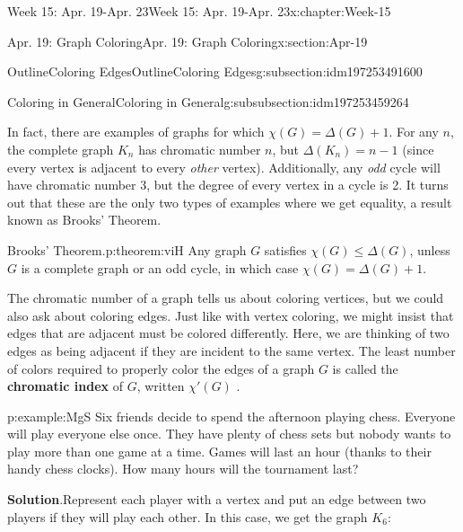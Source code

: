 \documentclass[oneside,10pt,]{book}
\newcommand{\blocktitlefont}{\relax}
\newcommand{\terminology}[1]{\textbf{#1}}
\numberwithin{equation}{section}
\renewcommand{\le}{\leqslant}
\begin{document}
\begin{chapterptx}{Week 15: Apr. 19-Apr. 23}{}{Week 15: Apr. 19-Apr. 23}{}{}{x:chapter:Week-15}
\begin{sectionptx}{Apr. 19: Graph Coloring}{}{Apr. 19: Graph Coloring}{}{}{x:section:Apr-19}
\begin{subsectionptx}{OutlineColoring Edges}{}{OutlineColoring Edges}{}{}{g:subsection:idm197253491600}
\begin{subsubsectionptx}{Coloring in General}{}{Coloring in General}{}{}{g:subsubsection:idm197253459264}
\par
In fact, there are examples of graphs for which \(\chi(G) = \Delta(G) + 1\). For any \(n\), the complete graph \(K_n\) has chromatic number \(n\), but \(\Delta(K_n) = n-1\) (since every vertex is adjacent to every \emph{other} vertex). Additionally, any \emph{odd} cycle will have chromatic number 3, but the degree of every vertex in a cycle is 2. It turns out that these are the only two types of examples where we get equality, a result known as Brooks' Theorem.%
\begin{theorem}{Brooks' Theorem.}{}{p:theorem:viH}%
%
Any graph \(G\) satisfies \(\chi(G) \le \Delta(G)\), unless \(G\) is a complete graph or an odd cycle, in which case \(\chi(G) = \Delta(G) + 1\).%
\end{theorem}
\end{subsubsectionptx}
 The chromatic number of a graph tells us about coloring vertices, but we could also ask about coloring edges. Just like with vertex coloring, we might insist that edges that are adjacent must be colored differently. Here, we are thinking of two edges as being adjacent if they are incident to the same vertex. The least number of colors required to properly color the edges of a graph \(G\) is called the \terminology{chromatic index} of \(G\), written \(\chi'(G)\) \label{g:notation:idm197253410960} .%
\begin{example}{}{p:example:MgS}%
Six friends decide to spend the afternoon playing chess. Everyone will play everyone else once. They have plenty of chess sets but nobody wants to play more than one game at a time. Games will last an hour (thanks to their handy chess clocks). How many hours will the tournament last?%
\par\smallskip%
\noindent\textbf{\blocktitlefont Solution}.\hypertarget{p:solution:hOW}{}\quad{}Represent each player with a vertex and put an edge between two players if they will play each other. In this case, we get the graph \(K_6\):%
\begin{sidebyside}{1}{0.4}{0.4}{0}%
\begin{sbspanel}{0.2}%
\end{sbspanel}
\end{sidebyside}
\end{example}
\end{subsectionptx}
\end{sectionptx}
\end{chapterptx}
\end{document}
